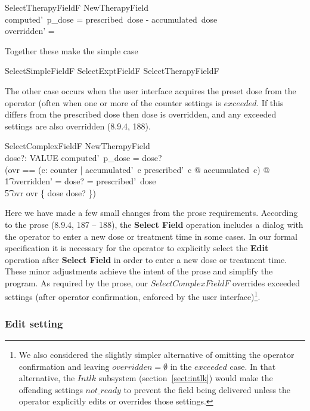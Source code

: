 \begin{schema}{SelectTherapyFieldF}
	NewTherapyField \\
\where
	computed'~p\_dose = prescribed~dose - accumulated~dose \\
	overridden' = \emptyset
\end{schema}
Together these make the simple case

\begin{zed}
	SelectSimpleFieldF  SelectExptFieldF \lor SelectTherapyFieldF
\end{zed}
The other case occurs when the user interface acquires the preset dose
from the operator (often when one or more of the counter settings is
$exceeded$.  If this differs from the prescribed dose then dose is
overridden, and any exceeded settings are also overridden (8.9.4,
188).

\begin{schema}{SelectComplexFieldF}
	NewTherapyField \\
	dose?: VALUE
\where
computed'~p\_dose = dose? \\
(\LET ovr == 
 (\lambda c: counter | accumulated'~c \geq prescribed'~c @ accumulated~c) @ \\
\t1  overridden' = \IF dose? = prescribed'~dose \\
\t5			\THEN ovr \ELSE ovr \cup \{ dose \mapsto dose? \})
\end{schema}
Here we have made a few small changes from the prose requirements.
According to the prose (8.9.4, 187 -- 188), the {\bf Select Field}
operation includes a dialog with the operator to enter a new dose or
treatment time in some cases.  In our formal specification it is
necessary for the operator to explicitly select the {\bf Edit}
operation after {\bf Select Field} in order to enter a new dose or
treatment time.  These minor adjustments achieve the intent of the
prose and simplify the program.  As required by the prose, our
$SelectComplexFieldF$ overrides exceeded settings (after operator
confirmation, enforced by the user interface)\footnote{We also
considered the slightly simpler alternative of omitting the operator
confirmation and leaving $overridden = \emptyset$ in the $exceeded$
case.  In that alternative, the $Intlk$ subsystem
(section~\ref{sect:intlk}) would make the offending settings
$not\_ready$ to prevent the field being delivered unless the operator
explicitly edits or overrides those settings.}.

\subsubsection{Edit setting}  \label{sect:editf}

